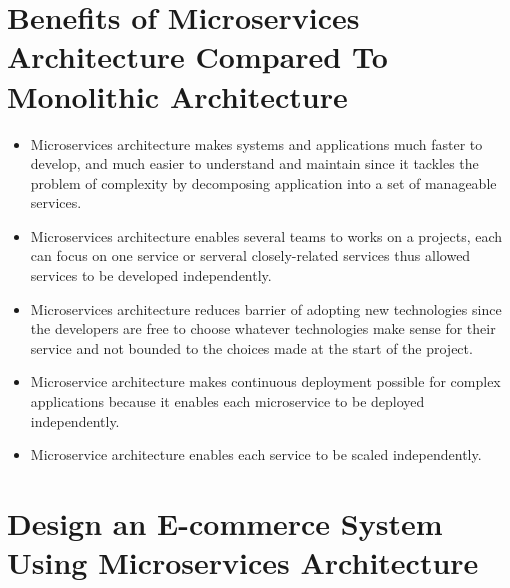\documentclass[11pt,a4paper]{article}
\begin{document}
	\section{Benefits of Microservices Architecture Compared To Monolithic Architecture}
		\begin{itemize}
			\item Microservices architecture makes systems and applications much faster to develop, and much easier to understand and maintain since it tackles the problem of complexity by decomposing application into a set of manageable services.
			\item Microservices architecture enables several teams to works on a projects, each can focus on one service or serveral closely-related services thus allowed services to be developed independently. 
			\item  Microservices architecture reduces barrier of adopting new technologies since the developers are free to choose whatever technologies make sense for their service and not bounded to the choices made at the start of the project.
			\item Microservice architecture makes continuous deployment possible for complex applications because it enables each microservice to be deployed independently.
			\item Microservice architecture enables each service to be scaled independently.
		\end{itemize}
	\section{Design an E-commerce System Using Microservices Architecture}
\end{document}
